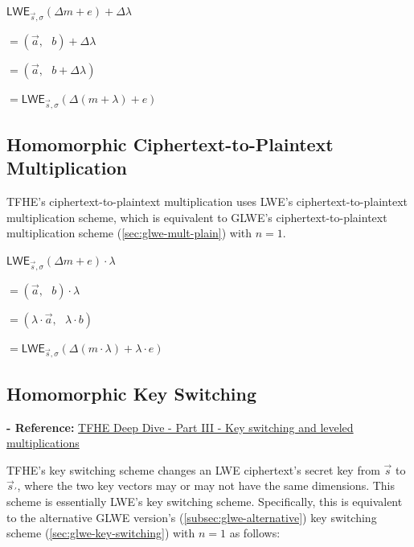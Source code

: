 \begin{tcolorbox}[title={\textbf{\tboxlabel{\ref*{subsec:tfhe-add-plain}} TFHE Ciphertext-to-Plaintext Addition}}]
$\textsf{LWE}_{\vec{s}, \sigma}(\Delta m + e) + \Delta \lambda $

$=  (\vec{a}, \text{ } b) + \Delta \lambda$

$=  (\vec{a}, \text{ } b + \Delta\lambda)$

$= \textsf{LWE}_{\vec{s}, \sigma}(\Delta (m + \lambda) + e )$
\end{tcolorbox}


\subsection{Homomorphic Ciphertext-to-Plaintext Multiplication}
\label{subsec:tfhe-mult-plain}

TFHE's ciphertext-to-plaintext multiplication uses LWE's ciphertext-to-plaintext multiplication scheme, which is equivalent to GLWE's ciphertext-to-plaintext multiplication scheme (\autoref{sec:glwe-mult-plain}) with $n = 1$.  

\begin{tcolorbox}[title={\textbf{\tboxlabel{\ref*{subsec:tfhe-mult-plain}} TFHE Ciphertext-to-Plaintext Multiplication}}]
$\textsf{LWE}_{\vec{s}, \sigma}(\Delta m + e) \cdot \lambda$

$= (\vec{a}, \text{ } b) \cdot \lambda$

$= (\lambda\cdot \vec{a}, \text{ } \lambda \cdot b)$

$= \textsf{LWE}_{\vec{s}, \sigma}(\Delta (m \cdot \lambda) + \lambda \cdot e )$
\end{tcolorbox}


\subsection{Homomorphic Key Switching}
\label{subsec:tfhe-key-switching}

\textbf{- Reference:} 
\href{https://www.zama.ai/post/tfhe-deep-dive-part-3}{TFHE Deep Dive - Part III - Key switching and leveled multiplications}~\cite{tfhe-3}

TFHE's key switching scheme changes an LWE ciphertext's secret key from $\vec{s}$ to $\vec{s}_{'}$, where the two key vectors may or may not have the same dimensions. This scheme is essentially LWE's key switching scheme. Specifically, this is equivalent to the alternative GLWE version's (\autoref{subsec:glwe-alternative}) key switching scheme (\autoref{sec:glwe-key-switching}) with $n = 1$ as follows:

